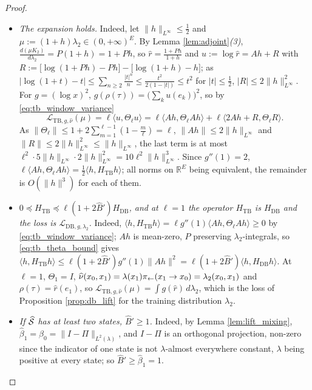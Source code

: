 \begin{proof}
\begin{itemize}
    \begin{equation}\label{eq:tb_theta_bound}
        \langle u,\Theta_\ell u\rangle\leq\Bigl(1+2\sum_{m=1}^{\ell-1}\bigl(1-\tfrac m\ell\bigr)\widehat\beta_m\Bigr)\|u\|^2\leq(1+2\widehat B')\|u\|^2\qquad\text{whenever }\Pi_2u=0.
    \end{equation}
    \item \emph{The expansion holds.} Indeed, let $\|h\|_{L^\infty}\leq\frac12$ and $\mu:=(1+h)\lambda_2\in(0,+\infty)^E$. By Lemma \ref{lem:adjoint}\emph{(3)}, $\frac{d(\mu K_2)}{d\lambda_2}=P(1+h)=1+Ph$, so $\widehat r=\frac{1+Ph}{1+h}$ and $u:=\log\widehat r=Ah+R$ with $R:=\bigl[\log(1+Ph)-Ph\bigr]-\bigl[\log(1+h)-h\bigr]$; as $|\log(1+t)-t|\leq\sum_{n\geq2}\frac{|t|^n}n\leq\frac{t^2}{2(1-|t|)}\leq t^2$ for $|t|\leq\frac12$, $|R|\leq2\|h\|_{L^\infty}^2$. For $g=(\log x)^2$, $g(\rho(\tau))=\bigl(\sum_ku(e_k)\bigr)^2$, so by \eqref{eq:tb_window_variance}
\begin{equation*}
    \mathcal L_{\mathrm{TB},g,\widehat\nu}(\mu)=\ell\langle u,\Theta_\ell u\rangle=\ell\langle Ah,\Theta_\ell Ah\rangle+\ell\langle 2Ah+R,\Theta_\ell R\rangle .
\end{equation*}
As $\|\Theta_\ell\|\leq1+2\sum_{m=1}^{\ell-1}(1-\frac m\ell)=\ell$, $\|Ah\|\leq2\|h\|_{L^\infty}$ and $\|R\|\leq2\|h\|^2_{L^\infty}\leq\|h\|_{L^\infty}$, the last term is at most $\ell^2\cdot5\|h\|_{L^\infty}\cdot2\|h\|_{L^\infty}^2=10\ell^2\|h\|^3_{L^\infty}$. Since $g''(1)=2$, $\ell\langle Ah,\Theta_\ell Ah\rangle=\frac12\langle h,H_{\mathrm{TB}}h\rangle$; all norms on $\mathbb R^E$ being equivalent, the remainder is $O(\|h\|^3)$ for each of them.
    \item \emph{$0\preceq H_{\mathrm{TB}}\preceq\ell(1+2\widehat B')H_{\mathrm{DB}}$, and at $\ell=1$ the operator $H_{\mathrm{TB}}$ is $H_{\mathrm{DB}}$ and the loss is $\mathcal L_{\mathrm{DB},g,\lambda_2}$.} Indeed, $\langle h,H_{\mathrm{TB}}h\rangle=\ell g''(1)\langle Ah,\Theta_\ell Ah\rangle\geq0$ by \eqref{eq:tb_window_variance}; $Ah$ is mean-zero, $P$ preserving $\lambda_2$-integrals, so \eqref{eq:tb_theta_bound} gives $\langle h,H_{\mathrm{TB}}h\rangle\leq\ell(1+2\widehat B')g''(1)\|Ah\|^2=\ell(1+2\widehat B')\langle h,H_{\mathrm{DB}}h\rangle$. At $\ell=1$, $\Theta_1=I$, $\widehat\nu(x_0,x_1)=\lambda(x_1)\pi_{\leftarrow}(x_1\rightarrow x_0)=\lambda_2(x_0,x_1)$ and $\rho(\tau)=\widehat r(e_1)$, so $\mathcal L_{\mathrm{TB},g,\widehat\nu}(\mu)=\int g(\widehat r)\,d\lambda_2$, which is the loss of Proposition \ref{prop:db_lift} for the training distribution $\lambda_2$.
    \item \emph{If $\widehat{\mathcal S}$ has at least two states, $\widehat B'\geq1$.} Indeed, by Lemma \ref{lem:lift_mixing}, $\widehat\beta_1=\beta_0=\|I-\Pi\|_{L^2(\lambda)}$, and $I-\Pi$ is an orthogonal projection, non-zero since the indicator of one state is not $\lambda$-almost everywhere constant, $\lambda$ being positive at every state; so $\widehat B'\geq\widehat\beta_1=1$.
\end{itemize}
\end{proof}

